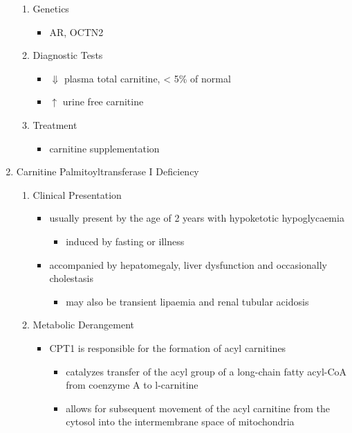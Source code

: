 \documentclass{scrartcl}
\begin{document}
\begin{enumerate}
\begin{enumerate}
\item Genetics
\label{sec:org0547931}
\begin{itemize}
\item AR, OCTN2
\end{itemize}
\item Diagnostic Tests
\label{sec:orgd3ef37b}
\begin{itemize}
\item \(\Downarrow\) plasma total carnitine, \textless{} 5\% of normal
\item \(\uparrow\) urine free carnitine
\end{itemize}
\item Treatment
\label{sec:orgda090c4}
\begin{itemize}
\item carnitine supplementation
\end{itemize}
\end{enumerate}
\item Carnitine Palmitoyltransferase I Deficiency
\label{sec:orgfa03bfd}
\begin{enumerate}
\item Clinical Presentation
\label{sec:org0337e37}
\begin{itemize}
\item usually present by the age of 2 years with hypoketotic hypoglycaemia
\begin{itemize}
\item induced by fasting or illness
\end{itemize}
\item accompanied by hepatomegaly, liver dysfunction and occasionally cholestasis
\begin{itemize}
\item may also be transient lipaemia and renal tubular acidosis
\end{itemize}
\end{itemize}
\item Metabolic Derangement
\label{sec:org7147808}
\begin{itemize}
\item CPT1 is responsible for the formation of acyl carnitines
\begin{itemize}
\item catalyzes transfer of the acyl group of a long-chain fatty
acyl-CoA from coenzyme A to l-carnitine
\item allows for subsequent movement of the acyl carnitine from the
cytosol into the intermembrane space of mitochondria
\end{itemize}

\end{itemize}
\end{enumerate}
\end{enumerate}
\end{document}
